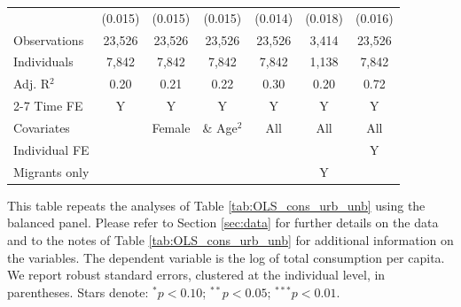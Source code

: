 \begin{table}[htbp]
\begin{threeparttable}
\begin{tabular}{l cccccc}
                    &     (0.015)   &     (0.015)   &     (0.015)   &     (0.014)   &     (0.018)   &     (0.016)   \\
\addlinespace
Observations        &      23,526   &      23,526   &      23,526   &      23,526   &       3,414   &      23,526   \\
Individuals         &       7,842   &       7,842   &       7,842   &       7,842   &       1,138   &       7,842   \\
Adj. R$^{2}$        &        0.20   &        0.21   &        0.22   &        0.30   &        0.20   &        0.72   \\
\cmidrule{2-7} Time FE & Y & Y & Y & Y & Y & Y \\ Covariates & & Female & \& Age$^2$ & All & All & All \\ Individual FE & & & & & & Y \\ Migrants only & & & & & Y & \\ \bottomrule \end{tabular} \begin{tablenotes}[flushleft] \footnotesize \item{This table repeats the analyses of Table \ref{tab:OLS_cons_urb_unb}  using the balanced panel. Please refer to Section \ref{sec:data} for further details on the data and to the notes of Table \ref{tab:OLS_cons_urb_unb} for additional information on the variables. The dependent variable is the log of total consumption per capita. We report robust standard errors, clustered at the individual level, in parentheses. Stars denote: $^{*} p<0.10$; $^{**} p<0.05$; $^{***} p<0.01$.} \end{tablenotes} \end{threeparttable} \end{table}
